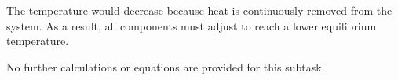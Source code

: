 The temperature would decrease because heat is continuously removed from the system. As a result, all components must adjust to reach a lower equilibrium temperature.  

No further calculations or equations are provided for this subtask.